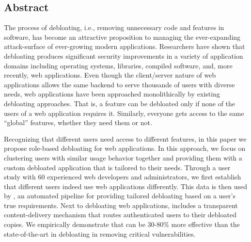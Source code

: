 \subsection*{Abstract}
The process of debloating, i.e., removing unnecessary code and features in software, has become an attractive proposition to managing the ever-expanding attack-surface of ever-growing modern applications. Researchers have shown that debloating produces significant security improvements in a variety of application domains including operating systems, libraries, compiled software, and, more recently, web applications. Even though the client/server nature of web applications allows the same backend to serve thousands of users with diverse needs, web applications have been approached monolithically by existing debloating approaches. That is, a feature can be debloated only if none of the users of a web application requires it. Similarly, everyone gets access to the same ``global'' features, whether they need them or not.

Recognizing that different users need access to different features, in this paper we propose role-based debloating for web applications. In this approach, we focus on clustering users with similar usage behavior together and providing them with a custom debloated application that is tailored to their needs. Through a user study with 60 experienced web developers and administrators, we first establish that different users indeed use web applications differently. This data is then used by \dbltr{}, an automated pipeline for providing tailored debloating based on a user's true requirements. Next to debloating web applications, \dbltr{} includes a transparent content-delivery mechanism that routes authenticated users to their debloated copies. 
We empirically demonstrate that \dbltr{} can be 30-80\% more effective than the state-of-the-art in debloating in removing critical vulnerabilities. 







